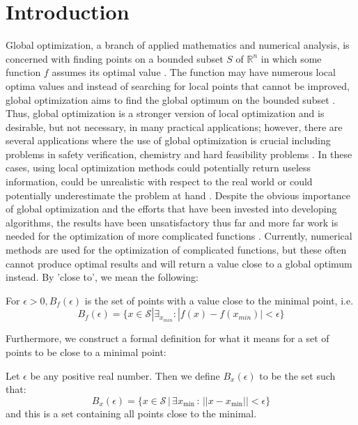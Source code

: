 \section{Introduction}
\label{sec:intro}

Global optimization, a branch of applied mathematics and numerical analysis, is concerned with finding points on a bounded subset $S$ of $\mathbb{R}^n$ in which some function $f$ assumes its optimal value \cite{dekkers}. The function may have numerous local optima values and instead of searching for local points that cannot be improved, global optimization aims to find the global optimum on the bounded subset \cite{neumaier}. Thus, global optimization is a stronger version of local optimization and is desirable, but not necessary, in many practical applications; however, there are several applications where the use of global optimization is crucial including problems in safety verification, chemistry and hard feasibility problems \cite{neumaier}. In these cases, using local optimization methods could potentially return useless information, could be unrealistic with respect to the real world or could potentially underestimate the problem at hand \cite{neumaier}. Despite the obvious importance of global optimization and the efforts that have been invested into developing algorithms, the results have been unsatisfactory thus far and more far work is needed for the optimization of more complicated functions \cite{dekkers}. Currently, numerical methods are used for the optimization of complicated functions, but these often cannot produce optimal results and will return a value close to a global optimum instead. By 'close to', we mean the following:

\begin{definition}
For $\epsilon > 0, B_f(\epsilon) $ is the set of points with a value close to the minimal point, i.e.
\begin{equation}
    B_f(\epsilon)=\{x \in \mathcal{S} |\exists_{{x}_{min}}:|f(x)-f({x}_{min})|<\epsilon \}
\end{equation}
\end{definition}

\noindent Furthermore, we construct a formal definition for what it means for a set of points to be close to a minimal point:
\begin{definition}
Let $\epsilon$ be any positive real number. Then we define $B_x(\epsilon)$ to be the set such that:
\begin{equation}
    B_x(\epsilon) = \{ x \in \mathcal{S} \, | \, \exists x_{\min} \, : \, ||x-x_{\min}|| < \epsilon \}
\end{equation}
and this is a set containing all points close to the minimal.
\label{def:close-to-min}
\end{definition}

